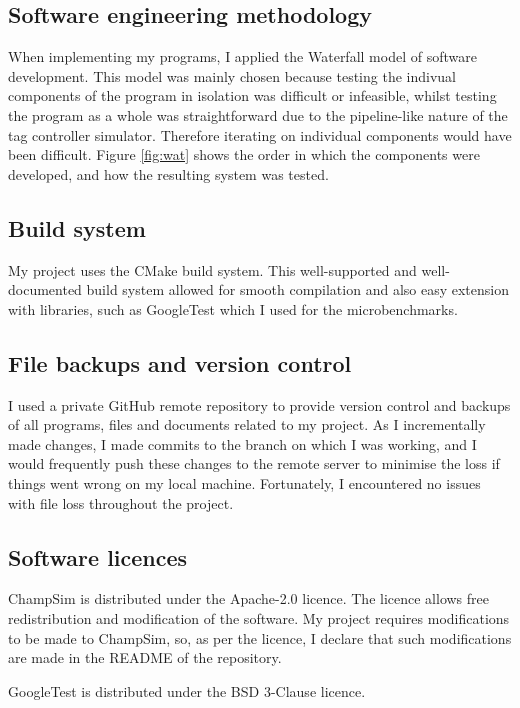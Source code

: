 \subsection{Software engineering methodology}
When implementing my programs, I applied the Waterfall model of software development. This model was mainly chosen because testing the indivual components of the program in isolation was difficult or infeasible, whilst testing the program as a whole was straightforward due to the pipeline-like nature of the tag controller simulator. Therefore iterating on individual components would have been difficult. Figure \ref{fig:wat} shows the order in which the components were developed, and how the resulting system was tested.


\subsection{Build system}
My project uses the CMake build system. This well-supported and well-documented build system allowed for smooth compilation and also easy extension with libraries, such as GoogleTest which I used for the microbenchmarks.

\subsection{File backups and version control}
I used a private GitHub remote repository to provide version control and backups of all programs, files and documents related to my project. As I incrementally made changes, I made commits to the branch on which I was working, and I would frequently push these changes to the remote server to minimise the loss if things went wrong on my local machine. Fortunately, I encountered no issues with file loss throughout the project.

\subsection{Software licences}
ChampSim is distributed under the Apache-2.0 licence. The licence allows free redistribution and modification of the software. My project requires modifications to be made to ChampSim, so, as per the licence, I declare that such modifications are made in the README of the repository.

GoogleTest is distributed under the BSD 3-Clause licence.

